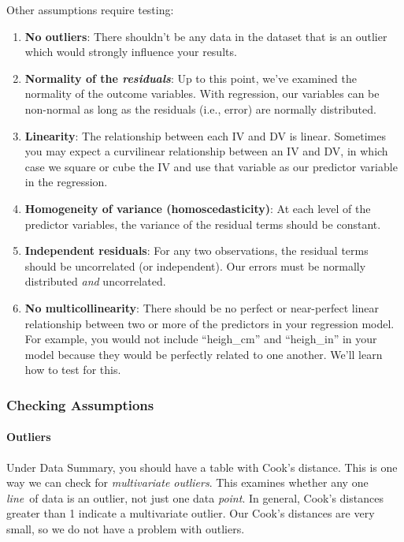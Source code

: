 \documentclass[
]{book}
\begin{document}
Other assumptions require testing:

\begin{enumerate}
\def\labelenumi{\arabic{enumi}.}
\item
  \textbf{No outliers}: There shouldn't be any data in the dataset that is an outlier which would strongly influence your results.
\item
  \textbf{Normality of the \emph{residuals}}: Up to this point, we've examined the normality of the outcome variables. With regression, our variables can be non-normal as long as the residuals (i.e., error) are normally distributed.
\item
  \textbf{Linearity}: The relationship between each IV and DV is linear. Sometimes you may expect a curvilinear relationship between an IV and DV, in which case we square or cube the IV and use that variable as our predictor variable in the regression.
\item
  \textbf{Homogeneity of variance (homoscedasticity)}: At each level of the predictor variables, the variance of the residual terms should be constant.
\item
  \textbf{Independent residuals}: For any two observations, the residual terms should be uncorrelated (or independent). Our errors must be normally distributed \emph{and} uncorrelated.
\item
  \textbf{No multicollinearity}: There should be no perfect or near-perfect linear relationship between two or more of the predictors in your regression model. For example, you would not include ``heigh\_cm'' and ``heigh\_in'' in your model because they would be perfectly related to one another. We'll learn how to test for this.
\end{enumerate}

\hypertarget{checking-assumptions-7}{%
\subsubsection{Checking Assumptions}\label{checking-assumptions-7}}

\hypertarget{outliers}{%
\paragraph{Outliers}\label{outliers}}

Under Data Summary, you should have a table with Cook's distance. This is one way we can check for \emph{multivariate outliers}. This examines whether any one \emph{line}~of data is an outlier, not just one data \emph{point}. In general, Cook's distances greater than 1 indicate a multivariate outlier. Our Cook's distances are very small, so we do not have a problem with outliers.
\end{document}
